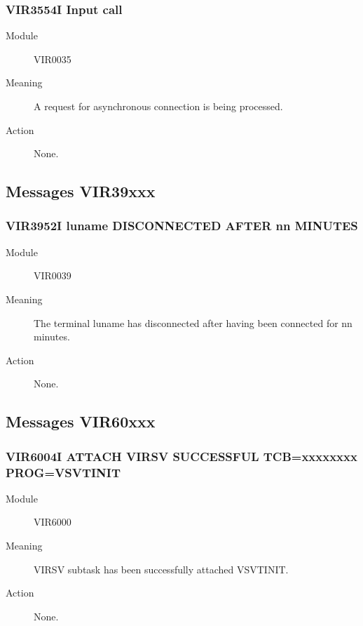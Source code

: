 \documentclass[letterpaper,10pt,english]{sphinxmanual}
\begin{document}
\subsubsection{VIR3554I Input call}
\label{\detokenize{messages:vir3554i-input-call}}\begin{description}
\item[{Module}] \leavevmode
VIR0035

\item[{Meaning}] \leavevmode
A request for asynchronous connection is being processed.

\item[{Action}] \leavevmode
None.

\end{description}


\subsection{Messages VIR39xxx}
\label{\detokenize{messages:messages-vir39xxx}}

\subsubsection{VIR3952I luname DISCONNECTED AFTER nn MINUTES}
\label{\detokenize{messages:vir3952i-luname-disconnected-after-nn-minutes}}\begin{description}
\item[{Module}] \leavevmode
VIR0039

\item[{Meaning}] \leavevmode
The terminal luname has disconnected after having been connected for nn minutes.

\item[{Action}] \leavevmode
None.

\end{description}


\subsection{Messages VIR60xxx}
\label{\detokenize{messages:messages-vir60xxx}}

\subsubsection{VIR6004I ATTACH VIRSV SUCCESSFUL TCB=xxxxxxxx PROG=VSVTINIT}
\label{\detokenize{messages:vir6004i-attach-virsv-successful-tcb-xxxxxxxx-prog-vsvtinit}}\begin{description}
\item[{Module}] \leavevmode
VIR6000

\item[{Meaning}] \leavevmode
VIRSV subtask has been successfully attached VSVTINIT.

\item[{Action}] \leavevmode
None.

\end{description}
\end{document}
